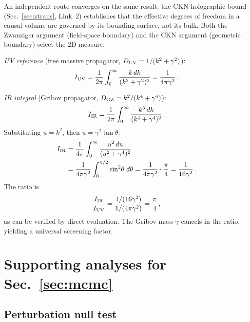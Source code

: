 \documentclass[a4paper,fleqn]{cas-dc}
\begin{document}
An independent route converges on the same result: the CKN
holographic bound (Sec.~\ref{sec:ztrans}, Link~2) establishes that
the effective degrees of freedom in a causal volume are governed by
its bounding surface, not its bulk. Both the Zwanziger argument
(field-space boundary) and the CKN argument (geometric boundary)
select the 2D measure.

\textit{UV reference} (free massive propagator,
$D_{\rm UV} = 1/(k^2 + \gamma^2)$):
\begin{equation}
I_{\rm UV} = \frac{1}{2\pi}\int_0^\infty
  \frac{k\,dk}{(k^2 + \gamma^2)^2}
  = \frac{1}{4\pi\gamma^2}\,.
\label{eq:IUV}
\end{equation}

\textit{IR integral} (Gribov propagator,
$D_{\rm GZ} = k^2/(k^4 + \gamma^4)$):
\begin{equation}
I_{\rm IR} = \frac{1}{2\pi}\int_0^\infty
  \frac{k^5\,dk}{(k^4 + \gamma^4)^2}\,.
\label{eq:IIR}
\end{equation}
Substituting $u = k^2$, then $u = \gamma^2\tan\theta$:
\begin{align}
I_{\rm IR}
  &= \frac{1}{4\pi}\int_0^\infty
    \frac{u^2\,du}{(u^2 + \gamma^4)^2}
  \notag \\
  &= \frac{1}{4\pi\gamma^2}\int_0^{\pi/2}
    \sin^2\!\theta\;d\theta
  = \frac{1}{4\pi\gamma^2}\cdot\frac{\pi}{4}
  = \frac{1}{16\gamma^2}\,.
\label{eq:IIR_result}
\end{align}
The ratio is
\begin{equation}
\frac{I_{\rm IR}}{I_{\rm UV}}
  = \frac{1/(16\gamma^2)}{1/(4\pi\gamma^2)}
  = \frac{\pi}{4}\,,
\label{eq:ratio}
\end{equation}
as can be verified by direct evaluation. The Gribov mass $\gamma$
cancels in the ratio, yielding a universal screening factor.




\section{Supporting analyses for Sec.~\ref{sec:mcmc}}
\label{app:free_params}

\subsection{Perturbation null test}
\label{app:null_test}
\end{document}
